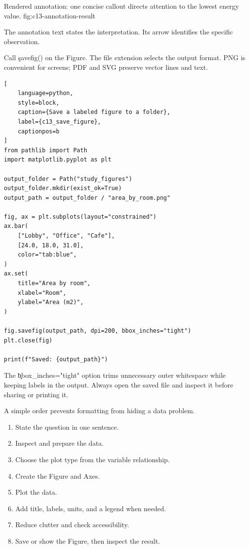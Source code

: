 {Rendered annotation: one concise callout directs attention to the lowest energy value.}
{fig:c13-annotation-result}

The annotation text states the interpretation. Its arrow identifies the
specific observation.


Call \c{savefig()} on the Figure. The file extension selects the output format.
PNG is convenient for screens; PDF and SVG preserve vector lines and text.

\begin{lstlisting}[
    language=python,
    style=block,
    caption={Save a labeled figure to a folder},
    label={c13_save_figure},
    captionpos=b
]
from pathlib import Path
import matplotlib.pyplot as plt

output_folder = Path("study_figures")
output_folder.mkdir(exist_ok=True)
output_path = output_folder / "area_by_room.png"

fig, ax = plt.subplots(layout="constrained")
ax.bar(
    ["Lobby", "Office", "Cafe"],
    [24.0, 18.0, 31.0],
    color="tab:blue",
)
ax.set(
    title="Area by room",
    xlabel="Room",
    ylabel="Area (m2)",
)

fig.savefig(output_path, dpi=200, bbox_inches="tight")
plt.close(fig)

print(f"Saved: {output_path}")
\end{lstlisting}

The \c{bbox_inches="tight"} option trims unnecessary outer whitespace while
keeping labels in the output. Always open the saved file and inspect it before
sharing or printing it.


A simple order prevents formatting from hiding a data problem.

\begin{enumerate}
    \item State the question in one sentence.
    \item Inspect and prepare the data.
    \item Choose the plot type from the variable relationship.
    \item Create the Figure and Axes.
    \item Plot the data.
    \item Add title, labels, units, and a legend when needed.
    \item Reduce clutter and check accessibility.
    \item Save or show the Figure, then inspect the result.
\end{enumerate}


